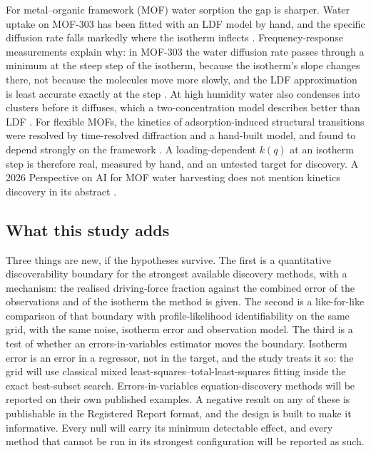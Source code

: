 \documentclass[11pt]{article}
\begin{document}
For metal--organic framework (MOF) water sorption the gap is sharper. Water uptake on
MOF-303 has been fitted with an LDF model by hand, and the specific diffusion rate falls
markedly where the isotherm inflects \citep{abuelmaaty2024}. Frequency-response
measurements explain why: in MOF-303 the water diffusion rate passes through a minimum at
the steep step of the isotherm, because the isotherm's slope changes there, not because the
molecules move more slowly, and the LDF approximation is least accurate exactly at the step
\citep{lassitter2024,hastings2024}. At high humidity water also condenses into clusters
before it diffuses, which a two-concentration model describes better than LDF
\citep{ma2025}. For
flexible MOFs, the kinetics of adsorption-induced structural transitions were resolved by
time-resolved diffraction and a hand-built model, and found to depend strongly on the
framework \citep{sakanaka2023}. A loading-dependent $k(q)$ at an isotherm step is therefore
real, measured by hand, and an untested target for discovery. A 2026 Perspective on AI for
MOF water harvesting does not mention kinetics discovery in its abstract \citep{coyle2026}.

\subsection*{What this study adds}
Three things are new, if the hypotheses survive. The first is a quantitative
discoverability boundary for the strongest available discovery methods, with a mechanism:
the realised driving-force fraction against the combined error of the observations and of
the isotherm the method is given. The second is a like-for-like comparison of that
boundary with profile-likelihood identifiability \citep{raue2009} on the same grid, with
the same noise, isotherm error and observation model. The third is a test of whether an
errors-in-variables estimator moves the boundary. Isotherm error is an error in a
regressor, not in the target, and the study treats it so: the grid will use classical mixed
least-squares--total-least-squares fitting \citep{golub1980,golub1987} inside the exact
best-subset search. Errors-in-variables equation-discovery methods
\citep{fung2026,bortz2023} will be reported on their own published examples. A negative
result on any of these is publishable in the Registered Report format, and the design is
built to make it informative. Every null will carry its minimum detectable effect, and
every method that cannot be run in its strongest configuration will be reported as such.
\end{document}
